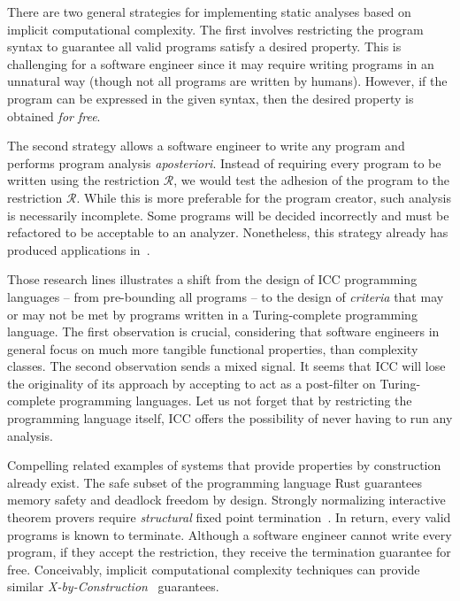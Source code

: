 There are two general strategies for implementing static analyses based on implicit computational complexity.
The first involves restricting the program syntax to guarantee all valid programs satisfy a desired property.
This is challenging for a software engineer since it may require writing programs in an unnatural way (though not all programs are written by humans).
However, if the program can be expressed in the given syntax, then the desired property is obtained \emph{for free}.

The second strategy allows a software engineer to write any program and performs program analysis \emph{aposteriori}.
Instead of requiring every program to be written using the restriction \(\mathcal{R}\),
we would test the adhesion of the program to the restriction \(\mathcal{R}\).
While this is more preferable for the program creator, such analysis is necessarily incomplete.
Some programs will be decided incorrectly and must be refactored to be acceptable to an analyzer.
Nonetheless, this strategy already has produced applications in~\textcite{moyen2016,moyen20172}.


Those research lines illustrates a shift from the design of ICC programming languages -- from pre-bounding all programs --
to the design of \emph{criteria} that may or may not be met by programs written in a Turing-complete programming language.
The first observation is crucial, considering that software engineers in general focus on much more tangible functional properties,
than complexity classes.
The second observation sends a mixed signal.
It seems that ICC will lose the originality of its approach by accepting to act as a post-filter on Turing-complete programming languages.
Let us not forget that by restricting the programming language itself, ICC offers the possibility of never having to run any analysis.

Compelling related examples of systems that provide properties by construction already exist.
The safe subset of the programming language Rust guarantees \eg memory safety and deadlock freedom by design.
Strongly normalizing interactive theorem provers require \emph{structural} fixed point termination~\cite{bertot2004}.
In return, every valid programs is known to terminate.
Although a software engineer cannot write every program, if they accept the restriction, they receive the termination guarantee for free.
Conceivably, implicit computational complexity techniques can provide similar \emph{X-by-Construction}~\cite{terbeek2018} guarantees.
